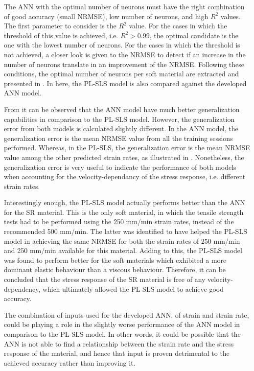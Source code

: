 The ANN with the optimal number of neurons must have the right combination of good accuracy (small NRMSE), low number of neurons, and high $R^2$ values. The first parameter to consider is the $R^2$ value. For the cases in which the threshold of this value is achieved, i.e. $R^2 > 0.99$, the optimal candidate is the one with the lowest number of neurons. For the cases in which the threshold is not achieved, a closer look is given to the NRMSE to detect if an increase in the number of neurons translate in an improvement of the NRMSE. Following these conditions, the optimal number of neurons per soft material are extracted and presented in . In here, the PL-SLS model is also compared against the developed ANN model.



From  it can be observed that the ANN model have much better generalization capabilities in comparison to the PL-SLS model. However, the generalization error from both models is calculated slightly different. In the ANN model, the generalization error is the mean NRMSE value from all the training sessions performed. Whereas, in the PL-SLS, the generalization error is the mean NRMSE value among the other predicted strain rates, as illustrated in . Nonetheless, the generalization error is very useful to indicate the performance of both models when accounting for the velocity-dependancy of the stress response, i.e. different strain rates.

Interestingly enough, the PL-SLS model actually performs better than the ANN for the SR material. This is the only soft material, in which the tensile strength tests had to be performed using the 250 mm/min strain rates, instead of the recommended 500 mm/min. The latter was identified to have helped the PL-SLS model in achieving the same NRMSE for both the strain rates of 250 mm/min and 250 mm/min available for this material. Adding to this, the PL-SLS model was found to perform better for the soft materials which exhibited a more dominant elastic behaviour than a viscous behaviour. Therefore, it can be concluded that the stress response of the SR material is free of any velocity-dependency, which ultimately allowed the PL-SLS model to achieve good accuracy. 

The combination of inputs used for the developed ANN, of strain and strain rate, could be playing a role in the slightly worse performance of the ANN model in comparison to the PL-SLS model. In other words, it could be possible that the ANN is not able to find a relationship between the strain rate and the stress response of the material, and hence that input is proven detrimental to the achieved accuracy rather than improving it.

